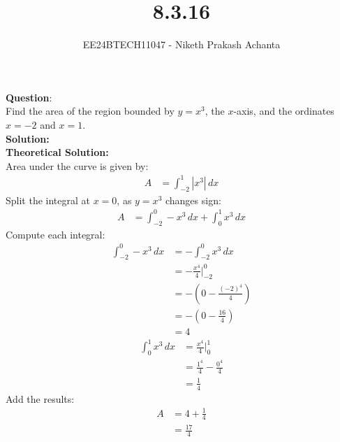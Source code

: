 \documentclass[journal]{IEEEtran}
\begin{document}

\vspace{3cm}

\title{8.3.16}
\author{EE24BTECH11047 - Niketh Prakash Achanta}
{\let\newpage\relax\maketitle}

\renewcommand{\thefigure}{\theenumi}
\renewcommand{\thetable}{\theenumi}
\setlength{\intextsep}{10pt} %

\renewcommand{\thetable}{\theenumi}
\textbf{Question}:\\
Find the area of the region bounded by $y = x^3$, the $x$-axis, and the ordinates $x = -2$ and $x = 1$.\\
\textbf{Solution: }\\
\textbf{Theoretical Solution:}\\
Area under the curve is given by:
\begin{align}
    A &= \int_{-2}^{1} |x^3| \, dx
\end{align}
Split the integral at $x = 0$, as $y = x^3$ changes sign:
\begin{align}
    A &= \int_{-2}^{0} -x^3 \, dx + \int_{0}^{1} x^3 \, dx
\end{align}
Compute each integral:
\begin{align}
    \int_{-2}^{0} -x^3 \, dx &= -\int_{-2}^{0} x^3 \, dx \\
    &= -\frac{x^4}{4} \Big|_{-2}^{0} \\
    &= -\left( 0 - \frac{(-2)^4}{4} \right) \\
    &= -\left( 0 - \frac{16}{4} \right) \\
    &= 4
\end{align}
\begin{align}
    \int_{0}^{1} x^3 \, dx &= \frac{x^4}{4} \Big|_{0}^{1} \\
    &= \frac{1^4}{4} - \frac{0^4}{4} \\
    &= \frac{1}{4}
\end{align}
Add the results:
\begin{align}
    A &= 4 + \frac{1}{4} \\
    &= \frac{17}{4}
\end{align}
\end{document}

